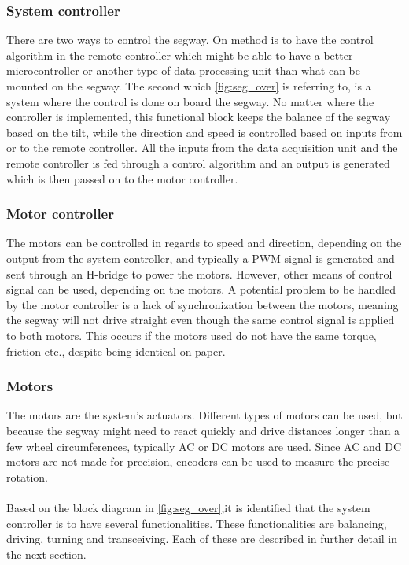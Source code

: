 \subsubsection{System controller}
There are two ways to control the segway. On method is to have the control algorithm in the remote controller which might be able to have a better microcontroller or another type of data processing unit than what can be mounted on the segway. The second which \autoref{fig:seg_over} is referring to, is a system where the control is done on board the segway. No matter where the controller is implemented, this functional block keeps the balance of the segway based on the tilt, while the direction and speed is controlled based on inputs from or to the remote controller. 
All the inputs from the data acquisition unit and the remote controller is fed through a control algorithm and an output is generated which is then passed on to the motor controller.


\subsubsection{Motor controller}
The motors can be controlled in regards to speed and direction, depending on the output from the system controller, and typically a PWM signal is generated and sent through an H-bridge to power the motors. However, other means of control signal can be used, depending on the motors. A potential problem to be handled by the motor controller is a lack of synchronization between the motors, meaning the segway will not drive straight even though the same control signal is applied to both motors. This occurs if the motors used do not have the same torque, friction etc., despite being identical on paper.

\subsubsection{Motors}
The motors are the system's actuators. Different types of motors can be used, but because the segway might need to react quickly and drive distances longer than a few wheel circumferences, typically AC or DC motors are used. Since AC and DC motors are not made for precision, encoders can be used to measure the precise rotation.\\\\


Based on the block diagram in \autoref{fig:seg_over},it is identified that the system controller is to have several functionalities. These functionalities are balancing, driving, turning and transceiving. Each of these are described in further detail in the next section.







